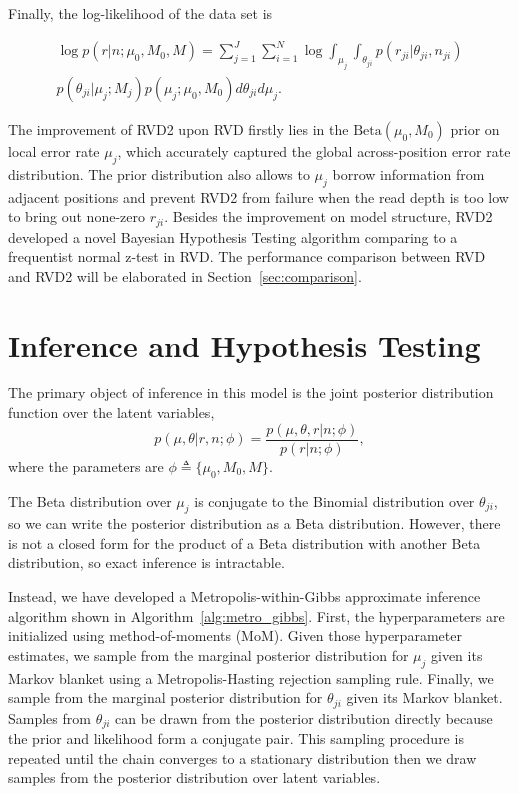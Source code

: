 \documentclass{bioinfo}
\begin{document}
Finally, the log-likelihood of the data set is

\begin{multline}
\log p \left( r | n ; \mu_0, M_0, M \right) = \sum_{j=1}^J \sum_{i=1}^N \log \int_{\mu_j} \int_{\theta_{ji}}  p \left( r_{ji} | \theta_{ji}, n_{ji} \right) \\ p\left( \theta_{ji} | \mu_j; M_j \right) p\left( \mu_j; \mu_0, M_0 \right) d\theta_{ji} d\mu_j.
\end{multline}

\label{Improvement of RVD2}
The improvement of RVD2 upon RVD firstly lies in the $ \text{Beta}(\mu_0, M_0) $ prior on local error rate $ \mu_j $, which accurately captured the global across-position error rate distribution. The prior distribution also  allows to $ \mu_j $ borrow information from adjacent positions and prevent RVD2 from failure when the read depth is too low to bring out none-zero $ r_{ji} $. Besides the improvement on model structure, RVD2 developed a novel Bayesian Hypothesis Testing algorithm comparing to a frequentist normal z-test in RVD. The performance comparison between RVD and RVD2 will be elaborated in Section~\ref{sec:comparison}.

\section{Inference and Hypothesis Testing}

The primary object of inference in this model is the joint posterior distribution function over the latent variables,
\begin{equation}
	p(\mu, \theta | r, n; \phi)  = \frac{ p(\mu, \theta, r | n; \phi) } {p ( r | n; \phi)},
\end{equation}
where the parameters are $\phi \triangleq \{\mu_0, M_0, M\}$.

The Beta distribution over $\mu_j$ is conjugate to the Binomial distribution over $\theta_{ji}$, so we can write the posterior distribution as a Beta distribution. However, there is not a closed form for the product of a Beta distribution with another Beta distribution, so exact inference is intractable.

Instead, we have developed a Metropolis-within-Gibbs  approximate inference algorithm shown in Algorithm~\ref{alg:metro_gibbs}. First, the hyperparameters are initialized using method-of-moments (MoM). Given those hyperparameter estimates, we sample from the marginal posterior distribution for $\mu_j$ given its Markov blanket using a Metropolis-Hasting rejection sampling rule. Finally, we sample from the marginal posterior distribution for $\theta_{ji}$ given its Markov blanket. Samples from $\theta_{ji}$ can be drawn from the posterior distribution directly  because the prior and likelihood form a conjugate pair. This sampling procedure is repeated until the chain converges to a stationary distribution then we draw samples from the posterior distribution over latent variables.
\end{document}
